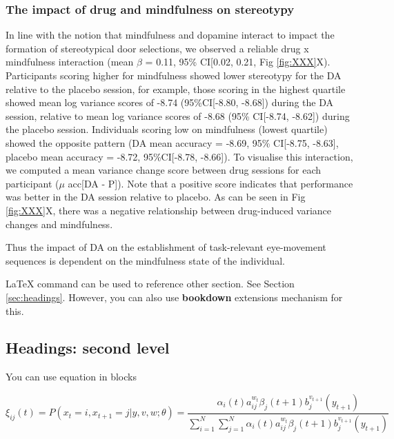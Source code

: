 \documentclass{article}
\begin{document}
\hypertarget{the-impact-of-drug-and-mindfulness-on-stereotypy}{%
\subsubsection{The impact of drug and mindfulness on
stereotypy}\label{the-impact-of-drug-and-mindfulness-on-stereotypy}}

In line with the notion that mindfulness and dopamine interact to impact
the formation of stereotypical door selections, we observed a reliable
drug x mindfulness interaction (mean \(\beta\) = 0.11, 95\% CI{[}0.02,
0.21, Fig \ref{fig:XXX}X). Participants scoring higher for mindfulness
showed lower stereotypy for the DA relative to the placebo session, for
example, those scoring in the highest quartile showed mean log variance
scores of -8.74 (95\%CI{[}-8.80, -8.68{]}) during the DA session,
relative to mean log variance scores of -8.68 (95\% CI{[}-8.74,
-8.62{]}) during the placebo session. Individuals scoring low on
mindfulness (lowest quartile) showed the opposite pattern (DA mean
accuracy = -8.69, 95\% CI{[}-8.75, -8.63{]}, placebo mean accuracy =
-8.72, 95\%CI{[}-8.78, -8.66{]}). To visualise this interaction, we
computed a mean variance change score between drug sessions for each
participant (\(\mu\) acc{[}DA - P{]}). Note that a positive score
indicates that performance was better in the DA session relative to
placebo. As can be seen in Fig \ref{fig:XXX}X, there was a negative
relationship between drug-induced variance changes and mindfulness.

Thus the impact of DA on the establishment of task-relevant eye-movement
sequences is dependent on the mindfulness state of the individual.

LaTeX command can be used to reference other section. See Section
\ref{sec:headings}. However, you can also use \textbf{bookdown}
extensions mechanism for this.

\hypertarget{headings-second-level}{%
\subsection{Headings: second level}\label{headings-second-level}}

You can use equation in blocks

\[
\xi _{ij}(t)=P(x_{t}=i,x_{t+1}=j|y,v,w;\theta)= {\frac {\alpha _{i}(t)a^{w_t}_{ij}\beta _{j}(t+1)b^{v_{t+1}}_{j}(y_{t+1})}{\sum _{i=1}^{N} \sum _{j=1}^{N} \alpha _{i}(t)a^{w_t}_{ij}\beta _{j}(t+1)b^{v_{t+1}}_{j}(y_{t+1})}}
\]
\end{document}
